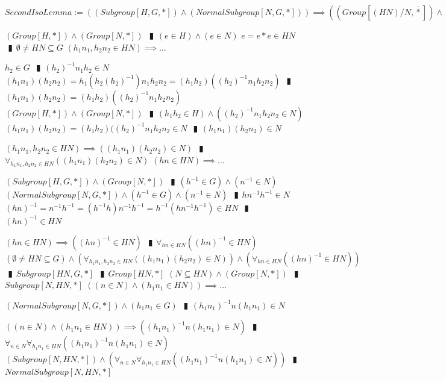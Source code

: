 \documentclass{book}
\newcommand{\abr}{:=}
\newcommand{\pipe}{$\phantom{(}\vrectangleblack\phantom{)}$}
\newcommand{\pr}[1]{\left(#1\right)}
\newcommand{\bbin}[1]{\mathbin{{\bar{#1}}}}
\begin{document}
$SecondIsoLemma \abr \pr{(Subgroup[H, G, *]) \land (NormalSubgroup[N, G, *])} \implies \pr{\pr{Group[(H N) / N, \bbin{*}]} \land \pr{Group[H / (H \cap N), \bbin{*}]}}$
\begin{enumerate}
  \lit $(Group[H, *]) \land (Group[N, *])$ \pipe $(e \in H) \land (e \in N)$
  \lit $e = e * e \in H N$ \pipe $\emptyset \neq H N \subseteq G$
  \lit $(h_1 n_1, h_2 n_2 \in H N) \implies \ldots$
  \begin{enumerate}
    \lit $h_2 \in G$ \pipe $(h_2)^{-1} n_1 h_2 \in N$
    \lit $(h_1 n_1) (h_2 n_2) = h_1 \pr{h_2 (h_2)^{-1}} n_1 h_2 n_2 = (h_1 h_2) \pr{(h_2)^{-1} n_1 h_2 n_2}$ \pipe $(h_1 n_1) (h_2 n_2) = (h_1 h_2) \pr{(h_2)^{-1} n_1 h_2 n_2}$
    \lit $(Group[H, *]) \land (Group[N, *])$ \pipe $(h_1 h_2 \in H) \land \pr{(h_2)^{-1} n_1 h_2 n_2 \in N}$
    \lit $(h_1 n_1) (h_2 n_2) = (h_1 h_2) ((h_2)^{-1} n_1 h_2 n_2 \in N$ \pipe $(h_1 n_1) (h_2 n_2) \in N$
  \end{enumerate}
  \lit $(h_1 n_1, h_2 n_2 \in H N) \implies \pr{(h_1 n_1) (h_2 n_2) \in N}$ \pipe $\forall_{h_1 n_1, h_2 n_2 \in H N}\pr{(h_1 n_1) (h_2 n_2) \in N}$
  \lit $(h n \in H N) \implies \ldots$
  \begin{enumerate}
    \lit $(Subgroup[H, G, *]) \land (Group[N, *])$ \pipe $(h^{-1} \in G) \land (n^{-1} \in N)$
    \lit $(NormalSubgroup[N, G, *]) \land (h^{-1} \in G) \land (n^{-1} \in N)$ \pipe  $h n^{-1} h^{-1} \in N$
    \lit $(h n)^{-1} = n^{-1} h^{-1} = (h^{-1} h) n^{-1} h^{-1} = h^{-1} (h n^{-1} h^{-1}) \in H N$ \pipe $(h n)^{-1} \in H N$
  \end{enumerate}
  \lit $(h n \in H N) \implies \pr{(h n)^{-1} \in H N}$ \pipe $\forall_{h n \in H N}\pr{(h n)^{-1} \in H N}$
  \lit $(\emptyset \neq H N \subseteq G) \land \pr{\forall_{h_1 n_1, h_2 n_2 \in H N}\pr{(h_1 n_1) (h_2 n_2) \in N}} \land \pr{\forall_{h n \in H N}\pr{(h n)^{-1} \in H N}}$ \pipe $Subgroup[H N, G, *]$ \pipe $Group[H N, *]$
  \lit $(N \subseteq H N) \land (Group[N, *])$ \pipe $Subgroup[N, H N, *]$
  \lit $\pr{(n \in N) \land (h_1 n_1 \in H N)} \implies \ldots$
  \begin{enumerate}
    \lit $(NormalSubgroup[N, G, *]) \land (h_1 n_1 \in G)$ \pipe $(h_1 n_1)^{-1} n (h_1 n_1) \in N$
  \end{enumerate}
  \lit $\pr{(n \in N) \land (h_1 n_1 \in H N)} \implies \pr{(h_1 n_1)^{-1} n (h_1 n_1) \in N}$ \pipe $\forall_{n \in N} \forall_{h_1 n_1 \in H N}\pr{(h_1 n_1)^{-1} n (h_1 n_1) \in N}$
  \lit $(Subgroup[N, H N, *]) \land \pr{\forall_{n \in N} \forall_{h_1 n_1 \in H N}\pr{(h_1 n_1)^{-1} n (h_1 n_1) \in N}}$ \pipe $NormalSubgroup[N, H N, *]$

\end{enumerate}
\end{document}
